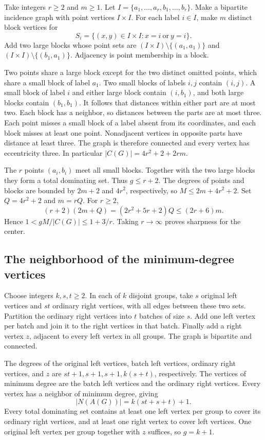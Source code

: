 \documentclass[11pt]{article}
\begin{document}
Take integers \(r\ge2\) and \(m\ge1\). Let
\(I=\{a_1,\ldots,a_r,b_1,\ldots,b_r\}\).
Make a bipartite incidence graph with point vertices \(I\times I\).
For each label \(i\in I\), make \(m\) distinct block vertices for
\[
 S_i=\{(x,y)\in I\times I: x=i\ \text{or}\ y=i\}.
\]
Add two large blocks whose point sets are
\((I\times I)\setminus\{(a_1,a_1)\}\) and
\((I\times I)\setminus\{(b_1,a_1)\}\). Adjacency is point
membership in a block.

Two points share a large block except for the two distinct omitted
points, which share a small block of label \(a_1\).
Two small blocks of labels \(i,j\) contain \((i,j)\).
A small block of label \(i\) and either large block contain
\((i,b_1)\), and both large blocks contain \((b_1,b_1)\).
It follows that distances within either part are at most two.
Each block has a neighbor, so distances between the parts are at
most three. Each point misses a small block of a label absent from
its coordinates, and each block misses at least one point.
Nonadjacent vertices in opposite parts have distance at least three.
The graph is therefore connected and every vertex has eccentricity
three. In particular \(|C(G)|=4r^2+2+2rm\).

The \(r\) points \((a_i,b_i)\) meet all small blocks. Together with
the two large blocks they form a total dominating set. Thus \(g\le
r+2\). The degrees of points and blocks are bounded by \(2m+2\)
and \(4r^2\), respectively, so \(M\le2m+4r^2+2\).
Set \(Q=4r^2+2\) and \(m=rQ\). For \(r\ge2\),
\[
 (r+2)(2m+Q)=(2r^2+5r+2)Q\le(2r+6)m.
\]
Hence \(1<gM/|C(G)|\le1+3/r\). Taking \(r\to\infty\) proves
sharpness for the center.

\subsection{The neighborhood of the minimum-degree vertices}\label{sec:minimum-degree-family}

Choose integers \(k,s,t\ge2\). In each of \(k\) disjoint groups,
take \(s\) original left vertices and \(st\) ordinary right
vertices, with all edges between these two sets. Partition the
ordinary right vertices into \(t\) batches of size \(s\).
Add one left vertex per batch and join it to the right vertices
in that batch. Finally add a right vertex \(z\), adjacent to every
left vertex in all groups. The graph is bipartite and connected.

The degrees of the original left vertices, batch left vertices,
ordinary right vertices, and \(z\) are \(st+1,s+1,s+1,k(s+t)\),
respectively. The vertices of minimum degree are the batch left
vertices and the ordinary right vertices. Every vertex has a
neighbor of minimum degree, giving
\[
 |N(A(G))|=k(st+s+t)+1.
\]
Every total dominating set contains at least one left vertex per
group to cover its ordinary right vertices, and at least one right
vertex to cover left vertices. One original left vertex per group
together with \(z\) suffices, so \(g=k+1\).
\end{document}
